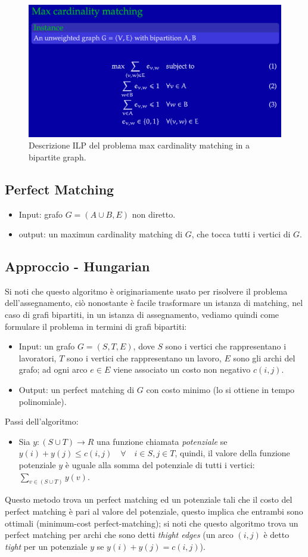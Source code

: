 \documentclass[12pt,a4paper]{article}
\begin{document}
\begin{figure}[h]
	\centering
	\includegraphics[width=0.8\linewidth]{img/max_card_match}
	\caption{Descrizione ILP del problema max cardinality matching in a bipartite graph.}
	\label{fig:max_card_match}
\end{figure}

\subsection{Perfect Matching}
\begin{itemize}
\item Input: grafo $G = (A \cup B, E)$ non diretto.
\item output: un maximun cardinality matching di $G$, che tocca tutti i vertici di $G$.
\end{itemize}

\subsection{Approccio - Hungarian}
Si noti che questo algoritmo è originariamente usato per risolvere il problema dell'assegnamento, ciò nonostante è facile trasformare un istanza di matching, nel caso di grafi bipartiti, in un istanza di assegnamento, vediamo quindi come formulare il problema in termini di grafi bipartiti:
\begin{itemize}
\item Input: un grafo $G = (S, T, E)$, dove $S$ sono i vertici che rappresentano i lavoratori, $T$ sono i vertici che rappresentano un lavoro, $E$ sono gli archi del grafo; ad ogni arco $e \in E$ viene associato un costo non negativo $c(i, j)$.
\item Output: un perfect matching di $G$ con costo minimo (lo si ottiene in tempo polinomiale).
\end{itemize}
Passi dell'algoritmo:
\begin{itemize}
\item Sia $y:(S \cup T) \rightarrow R$ una funzione chiamata \textit{potenziale} se $y(i) + y(j) \leq c(i, j) \quad \forall \quad i \in S, j \in T$, quindi, il valore della funzione potenziale $y$ è uguale alla somma del potenziale di tutti i vertici: $\displaystyle\sum_{v \in (S \cup T)} y(v)$.
\end{itemize}
Questo metodo trova un perfect matching ed un potenziale tali che il costo del perfect matching è pari al valore del potenziale, questo implica che entrambi sono ottimali (minimum-cost perfect-matching); si noti che questo algoritmo trova un perfect matching per archi che sono detti \textit{thight edges} (un arco $(i, j )$ è detto \textit{tight} per un potenziale $y$ se $y(i) + y(j) = c(i, j)$).
\end{document}
